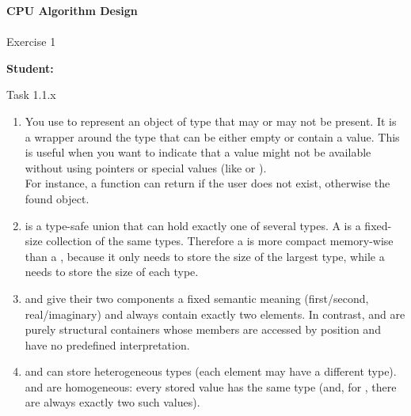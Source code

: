 





\begin{Large}
    \textsf{\textbf{CPU Algorithm Design}} \\
    \\
    Exercise 1
\end{Large}
\vspace{1ex}
\textsf{\textbf{Student:}}  \\
\vspace{2ex}

\begin{problem}{}{Task 1.1.x}
    \begin{enumerate}[(1)]
        \item 
            You use  to represent an object of type  that may or may not be present. 
            It is a wrapper around the type  that can be either empty or contain a value. 
            This is useful when you want to indicate that a value might not be available without using pointers or special 
            values (like  or ). \\
            For instance, a  function can return 
            if the user does not exist, otherwise the found  object.
        \item 
             is a type-safe union that can hold exactly one of several types. 
            A  is a fixed-size collection of the same types.
            Therefore a  is more compact memory-wise than a , 
            because it only needs to store the size of the largest type, while a  
            needs to store the size of each type.
        \item  
             and  give their two
            components a fixed semantic meaning (first/second,
            real/imaginary) and always contain exactly two elements.  
            In contrast,  and  are
            purely structural containers whose members are accessed by
            position and have no predefined interpretation.

        \item  
             and  can store
            heterogeneous types (each element may have a different
            type).  
             and 
            are homogeneous: every stored value has the same type
             (and, for , there are always
            exactly two such values).


\end{enumerate}
\end{problem}
